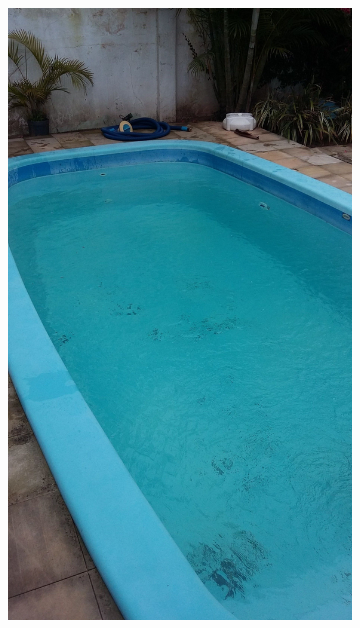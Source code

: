 \begin{figure}[H]
    \centering
    \begin{subfigure}[t]{0.22\textwidth}
        \includegraphics[width=\textwidth]{dados/figuras/piscina_1.jpg}
    \end{subfigure}
    \hspace{1em}
    \begin{subfigure}[t]{0.22\textwidth}

\end{subfigure}
\end{figure}
